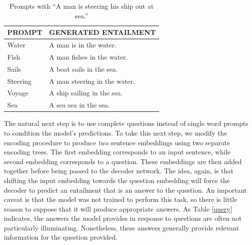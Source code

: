 \documentclass[utf8]{frontiersSCNS} %
\begin{document}
\begin{table}[!t]
\begin{center} 
\caption{Prompts with ``A man is steering his ship out at sea.''} 
\vskip 0.15in
\label{prompt} 

\setlength{\tabcolsep}{25pt}
\begin{tabular}{ll} 

\hline

\rule{0pt}{3ex} PROMPT & \qquad \qquad \quad GENERATED ENTAILMENT \\

\hline
\rule{0pt}{3ex}\quad Water & \qquad \qquad A man is in the water. \\
\quad Fish & \qquad \qquad A man fishes in the water. \\
\quad Sails & \qquad \qquad A boat sails in the sea. \\
\quad Steering & \qquad \qquad A man steering in the water. \\
\quad Voyage & \qquad \qquad A ship sailing in the sea. \\
\quad Sea & \qquad \qquad A sea sea in the sea. \\
\hline
\end{tabular}
\end{center} 
\end{table}

The natural next step is to use complete questions instead of single word prompts to condition the model's predictions. To take this next step, we modify the encoding procedure to produce \textit{two} sentence embeddings using two separate encoding trees. The first embedding corresponds to an input sentence, while second embedding corresponds to a question. These embeddings are then added together before being passed to the decoder network. The idea, again, is that shifting the input embedding towards the question embedding will force the decoder to predict an entailment that is an answer to the question. An important caveat is that the model was not trained to perform this task, so there is little reason to suppose that it will produce appropriate answers. As Table \ref{query} indicates, the answers the model provides in response to questions are often not particularly illuminating. Nonetheless, these answers generally provide relevant information for the question provided. 
\end{document}

